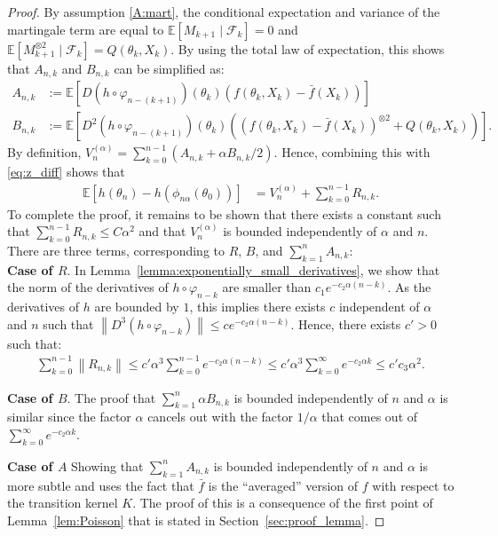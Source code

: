 \documentclass{article}
\newcommand{\calF}{\mathcal{F}}
\newcommand\E{\mathbb{E}}
\newcommand\esp[1]{\E\left[#1\right]}
\newcommand\norm[1]{\left\|#1\right\|}
\newcommand\toA{^{(\alpha)}}
\newcommand\barf{\bar{f}}
\begin{document}
\begin{proof}
    By assumption \ref{A:mart}, the conditional expectation and variance of the martingale term are equal to $\esp{M_{k+1}\mid \calF_{k}} = 0$ and $\esp{M_{k+1}^{\otimes2}\mid \calF_{k}}=Q(\theta_{k},X_{k})$. By using the total law of expectation, this shows that $A_{n,k}$ and $B_{n,k}$ can be simplified as:
    \begin{align*}
        A_{n,k} &:= \esp{D(h\circ\varphi_{n-(k+1)})(\theta_{k})(f(\theta_{k},X_{k})-\barf(X_{k}))}\\
        B_{n,k} &:= \esp{D^2(h\circ\varphi_{n-(k+1)})(\theta_{k}) \left((f (\theta_{k},X_{k})-\barf(X_{k}))^{\otimes 2} + Q(\theta_{k},X_{k})\right)}.
    \end{align*}
    By definition, $V\toA_n = \sum_{k=0}^{n-1}(A_{n,k} + \alpha B_{n,k}/2)$. Hence, combining this with \eqref{eq:z_diff} shows that
    \begin{align*}
        \esp{h(\theta_n) - h(\phi_{n\alpha}(\theta_0))} &= V\toA_n + \sum_{k=0}^{n-1} R_{n,k}.
    \end{align*}
    To complete the proof, it remains to be shown that there exists a constant such that $\sum_{k=0}^{n-1} R_{n,k} \le C\alpha^2$ and that $V\toA_n$ is bounded independently of $\alpha$ and $n$. There are three terms, corresponding to $R$, $B$, and $\sum_{k=1}^n A_{n,k}$:\\
    \textbf{Case of $R$}. In Lemma~\ref{lemma:exponentially_small_derivatives}, we show that the norm of the derivatives of $h\circ\varphi_{n-k}$ are smaller than $c_1 e^{- c_2\alpha (n-k)}$. As the derivatives of $h$ are bounded by $1$, this implies there exists $c$ independent of $\alpha$ and $n$ such that $\norm{D^3(h\circ\varphi_{n-k})}\le ce^{-c_2\alpha (n-k)}$. Hence, there exists $c'>0$ such that: 
    \begin{align*}
        \sum_{k=0}^{n-1} \norm{R_{n,k}}\le c' \alpha^3 \sum_{k=0}^{n-1} e^{-c_2\alpha (n-k)} \le c' \alpha^3 \sum_{k=0}^\infty e^{-c_2\alpha k} \le c'c_3 \alpha^2.
    \end{align*}
        
    \textbf{Case of $B$}.     The proof that $\sum_{k=1}^n \alpha B_{n,k}$ is bounded independently of $n$ and $\alpha$ is similar since the factor $\alpha$ cancels out with the factor $1/\alpha$ that comes out of $\sum_{k=0}^\infty e^{-c_2\alpha k}$.

    \textbf{Case of $A$} Showing that $\sum_{k=1}^n A_{n,k}$ is bounded independently of $n$ and $\alpha$ is more subtle and uses the fact that $\barf$ is the ``averaged'' version of $f$ with respect to the transition kernel $K$.  The proof of this is a consequence of the first point of Lemma~\ref{lem:Poisson} that is stated in Section~\ref{sec:proof_lemma}. 
\end{proof}
\end{document}
